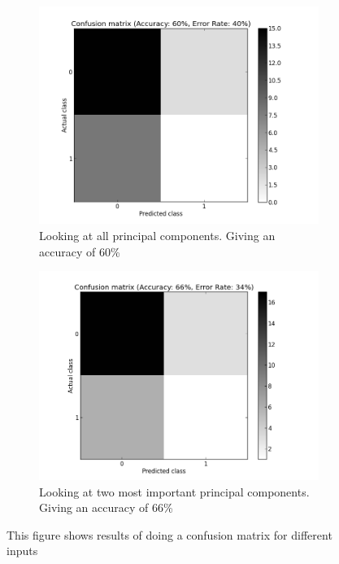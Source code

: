 \begin{figure}[H]
	\begin{subfigure}[b]{0.5\textwidth}
	\includegraphics[scale=0.2]{pictures/cmPC.png}
	\caption{Looking at all principal components. \newline Giving an accuracy of 60\%}
	\label{cmResultXPA}
	\end{subfigure}
	\begin{subfigure}[b]{0.5\textwidth}
	\includegraphics[scale=0.2]{pictures/cm2PC.png}
	\caption{Looking at two most important principal components.  Giving an accuracy of 66\%}
	\label{cmX2PA}
	\end{subfigure}
\caption{This figure shows results of doing a confusion matrix for different inputs}
\label{cmResults}
\end{figure}

